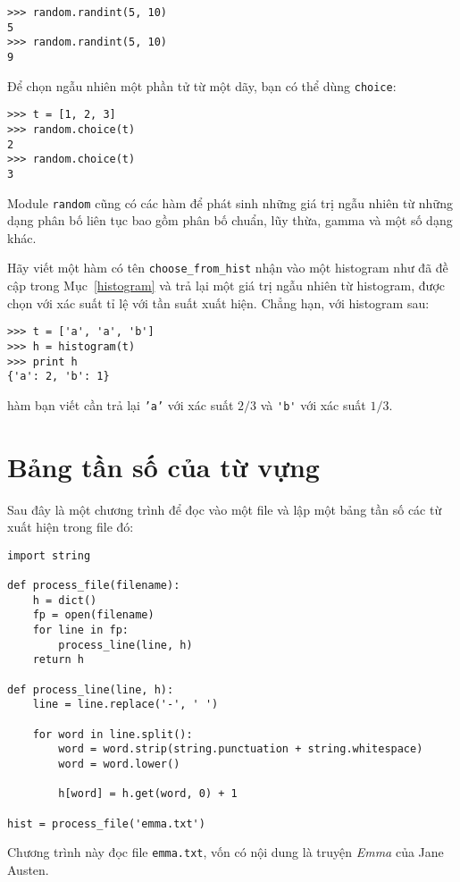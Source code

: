 \documentclass[11pt]{book}
\begin{document}

\beforeverb
\begin{verbatim}
>>> random.randint(5, 10)
5
>>> random.randint(5, 10)
9
\end{verbatim}
\afterverb
%
Để chọn ngẫu nhiên một phần tử từ một dãy, bạn có thể dùng
{\tt choice}:


\beforeverb
\begin{verbatim}
>>> t = [1, 2, 3]
>>> random.choice(t)
2
>>> random.choice(t)
3
\end{verbatim}
\afterverb
%
Module {\tt random} cũng có các hàm để phát sinh những giá trị
ngẫu nhiên từ những dạng phân bố liên tục bao gồm phân bố chuẩn,
lũy thừa, gamma và một số dạng khác.

\begin{ex}


Hãy viết một hàm có tên \verb"choose_from_hist" nhận vào một
histogram như đã đề cập trong Mục~\ref{histogram} và trả lại một
giá trị ngẫu nhiên từ histogram, được chọn với xác suất tỉ lệ
với tần suất xuất hiện. Chẳng hạn, với histogram sau:

\beforeverb
\begin{verbatim}
>>> t = ['a', 'a', 'b']
>>> h = histogram(t)
>>> print h
{'a': 2, 'b': 1}
\end{verbatim}
\afterverb
%
hàm bạn viết cần trả lại {\tt 'a'} với xác suất $2/3$ và \verb"'b'"
với xác suất $1/3$.
\end{ex}


\section{Bảng tần số của từ vựng}

Sau đây là một chương trình để đọc vào một file và lập một bảng
tần số các từ xuất hiện trong file đó:



\beforeverb
\begin{verbatim}
import string

def process_file(filename):
    h = dict()
    fp = open(filename)
    for line in fp:
        process_line(line, h)
    return h

def process_line(line, h):
    line = line.replace('-', ' ')
    
    for word in line.split():
        word = word.strip(string.punctuation + string.whitespace)
        word = word.lower()

        h[word] = h.get(word, 0) + 1

hist = process_file('emma.txt')
\end{verbatim}
\afterverb
%
Chương trình này đọc file {\tt emma.txt}, vốn có nội dung là truyện {\em
  Emma} của Jane Austen.
\end{document}

